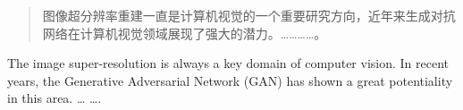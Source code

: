 
\begin{abstract}
    

    图像超分辨率重建一直是计算机视觉的一个重要研究方向，近年来生成对抗网络在计算机视觉领域展现了强大的潜力。…………。

    
\end{abstract}


\begin{abstractEN}
    
    The  image super-resolution is always a key domain of computer vision. In recent years, the Generative Adversarial Network (GAN) has shown a great potentiality in this area. … …. 
    
    
\end{abstractEN}




